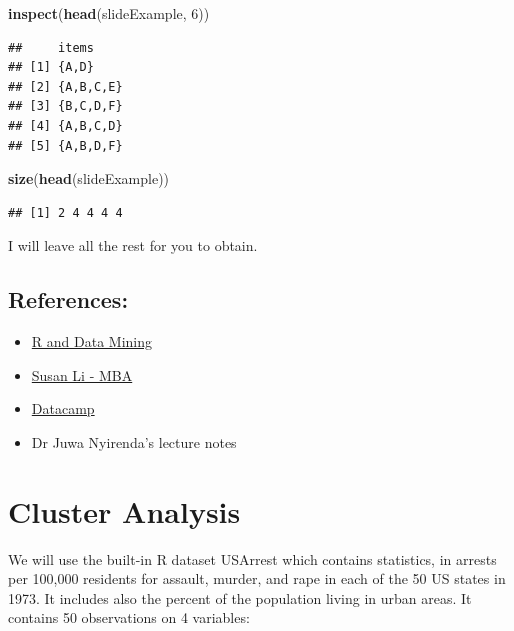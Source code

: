 \documentclass[
]{book}
\newenvironment{Shaded}{\begin{snugshade}}{\end{snugshade}}
\newcommand{\DecValTok}[1]{\textcolor[rgb]{0.00,0.00,0.81}{#1}}
\newcommand{\KeywordTok}[1]{\textcolor[rgb]{0.13,0.29,0.53}{\textbf{#1}}}
\newcommand{\NormalTok}[1]{#1}
\providecommand{\tightlist}{%
  \setlength{\itemsep}{0pt}\setlength{\parskip}{0pt}}
\begin{document}
\begin{Shaded}
\begin{Highlighting}[]
\KeywordTok{inspect}\NormalTok{(}\KeywordTok{head}\NormalTok{(slideExample, }\DecValTok{6}\NormalTok{))}
\end{Highlighting}
\end{Shaded}

\begin{verbatim}
##     items    
## [1] {A,D}    
## [2] {A,B,C,E}
## [3] {B,C,D,F}
## [4] {A,B,C,D}
## [5] {A,B,D,F}
\end{verbatim}

\begin{Shaded}
\begin{Highlighting}[]
\KeywordTok{size}\NormalTok{(}\KeywordTok{head}\NormalTok{(slideExample))}
\end{Highlighting}
\end{Shaded}

\begin{verbatim}
## [1] 2 4 4 4 4
\end{verbatim}

I will leave all the rest for you to obtain.

\hypertarget{references}{%
\section{References:}\label{references}}

\begin{itemize}
\tightlist
\item
  \href{http://www.rdatamining.com/examples/association-rules}{R and Data Mining}
\item
  \href{https://github.com/susanli2016/Data-Analysis-with-R/blob/master/Market_Basket_Analysis.Rmd}{Susan Li - MBA}
\item
  \href{https://www.datacamp.com/community/tutorials/market-basket-analysis-r}{Datacamp}
\item
  Dr Juwa Nyirenda's lecture notes
\end{itemize}

\hypertarget{cluster-analysis}{%
\chapter{Cluster Analysis}\label{cluster-analysis}}

We will use the built-in R dataset USArrest which contains statistics, in arrests per 100,000 residents for assault, murder, and rape in each of the 50 US states in 1973. It includes also the percent of the population living in urban areas. It contains 50 observations on 4 variables:
\end{document}

